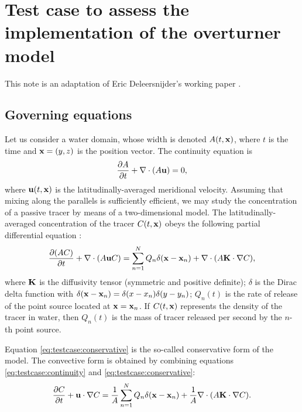 \section*{Test case to assess the implementation of the overturner model}
This note is an adaptation of Eric Deleersnijder's working paper \cite{deleersnijder2011test}.

\subsection*{Governing equations}
Let us consider a water domain, whose width is denoted $A(t,\mathbf{x})$, where $t$ is the time and $\mathbf{x} = (y,z)$ is the position vector. The continuity equation is
\begin{equation} \label{eq:testcase:continuity}
	\frac{\partial A}{\partial t} + \nabla \cdot (A\mathbf{u}) = 0,
\end{equation}
where $\mathbf{u}(t,\mathbf{x})$ is the latitudinally-averaged meridional velocity. Assuming that mixing along the parallels is sufficiently efficient, we may study the concentration of a passive tracer by means of a two-dimensional model. The latitudinally-averaged concentration of the tracer $C(t,\mathbf{x})$ obeys the following partial differential equation :
\begin{equation} \label{eq:testcase:conservative}
	\frac{\partial (AC)}{\partial t} + \nabla \cdot (A \mathbf{u} C) = \sum_{n=1}^N Q_n \delta(\mathbf{x} - \mathbf{x}_n) + \nabla \cdot (A\mathbf{K} \cdot \nabla C), 
\end{equation}
where $\mathbf{K}$ is the diffusivity tensor (symmetric and positive definite); $\delta$ is the Dirac delta function with $\delta(\mathbf{x}-\mathbf{x}_n) = \delta(x-x_n)\delta(y-y_n)$; $Q_n(t)$ is the rate of release of the point source located at $\mathbf{x} = \mathbf{x}_n$. If $C(t,\mathbf x)$ represents the 
density of the tracer in water, then $Q_n(t)$ is the mass of tracer released per second by the $n$-th point source.

Equation \eqref{eq:testcase:conservative} is the so-called conservative form of the model. The convective form is obtained by combining equations \eqref{eq:testcase:continuity} and \eqref{eq:testcase:conservative}:
\begin{equation}  \label{eq:testcase:convective}
	\frac{\partial C}{\partial t} + \mathbf{u} \cdot \nabla C = \frac{1}{A}\sum_{n=1}^N Q_n \delta(\mathbf{x} - \mathbf{x}_n) + \frac{1}{A} \nabla \cdot (A\mathbf{K} \cdot \nabla C).
\end{equation}

